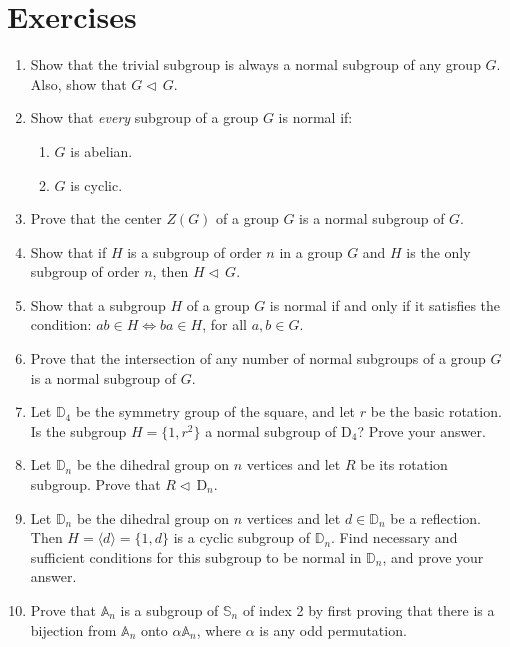 \documentclass[11pt]{article}
\newenvironment{problems}
{
 \begin{enumerate}[topsep=1pt,itemsep=0pt,parsep=2pt,leftmargin=0.6cm,%
 label={\arabic*.}, ref=\arabic*] \small
}
{
 \end{enumerate}
}
\theoremstyle{definition}
\newcommand{\gen}[1]{\langle #1 \rangle}
\newcommand{\Sym}{\mathbb{S}}
\newcommand{\Alt}{\mathbb{A}}
\newcommand{\D}{\mathbb{D}}
\newcommand{\normal}{\triangleleft\,}%
\begin{document}
\section*{Exercises}
\begin{problems}

\item Show that the trivial subgroup is always a normal subgroup of
  any group $G$. Also, show that $G \normal G$. 

\item Show that \emph{every} subgroup of a group $G$ is normal if:
  \begin{enumerate}
  \item $G$ is abelian.
  \item $G$ is cyclic.
  \end{enumerate}

\item Prove that the center $Z(G)$ of a group $G$ is a
  normal subgroup of $G$.

\item Show that if $H$ is a subgroup of order $n$ in a group $G$ and
  $H$ is the only subgroup of order $n$, then $H \normal G$.

\item Show that a subgroup $H$ of a group $G$ is normal if and only if
  it satisfies the condition: $ab \in H \iff ba \in H$, for all $a,b
  \in G$.

\item Prove that the intersection of any number of normal subgroups of
  a group $G$ is a normal subgroup of $G$.

\item Let $\D_4$ be the symmetry group of the square, and let $r$ be
  the basic rotation. Is the subgroup $H = \{ 1, r^2 \}$ a normal
  subgroup of $\mathrm{D}_4$?  Prove your answer.

\item Let $\D_n$ be the dihedral group on $n$
  vertices and let $R$ be its rotation subgroup. Prove that
  $R \normal \mathrm{D}_n$.

\item Let $\D_n$ be the dihedral group on $n$ vertices and let $d \in
  \D_n$ be a reflection. Then $H = \gen{d} = \{1, d\}$ is a cyclic
  subgroup of $\D_n$. Find necessary and sufficient conditions for
  this subgroup to be normal in $\D_n$, and prove your answer.

\item Prove that $\Alt_n$ is a subgroup of
  $\Sym_n$ of index 2 by first proving that there is a bijection from
  $\Alt_n$ onto $\alpha \Alt_n$, where $\alpha$ is any odd
  permutation.


\end{problems}
\end{document}

